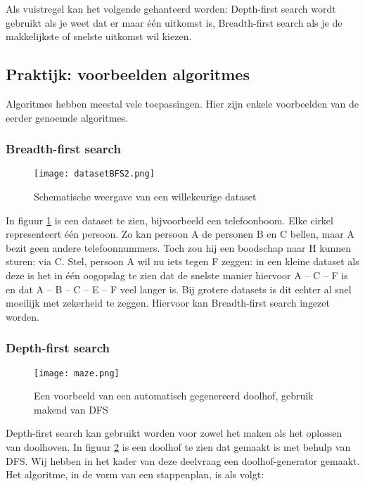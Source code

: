 Als vuistregel kan het volgende gehanteerd worden: Depth-first search wordt gebruikt als je weet dat er maar \'e\'en uitkomst is, Breadth-first search als je de makkelijkste of snelste uitkomst wil kiezen.

\subsection{Praktijk: voorbeelden algoritmes}
Algoritmes hebben meestal vele toepassingen. Hier zijn enkele voorbeelden van de eerder genoemde algoritmes.\\

\subsubsection{Breadth-first search}
\begin{figure}[H]
  \centering
    \texttt{[image: datasetBFS2.png]}
  \caption{Schematische weergave van een willekeurige dataset}
  \label{fig:datasetBFS2}
\end{figure}

In figuur \ref{fig:datasetBFS2} is een dataset te zien, bijvoorbeeld een telefoonboom. Elke cirkel representeert \'e\'en persoon. Zo kan persoon A de personen B en C bellen, maar A bezit geen andere telefoonnummers. Toch zou hij een boodschap naar H kunnen sturen: via C. 
Stel, persoon A wil nu iets tegen F zeggen: in een kleine dataset als deze is het in \'e\'en oogopslag te zien dat de snelste manier hiervoor A – C – F is en dat A – B – C – E – F veel langer is. Bij grotere datasets is dit echter al snel moeilijk met zekerheid te zeggen. Hiervoor kan Breadth-first search ingezet worden.

\subsubsection{Depth-first search}

\begin{figure}[H]
  \centering
    \texttt{[image: maze.png]}
  \caption{Een voorbeeld van een automatisch gegenereerd doolhof, gebruik makend van DFS}
  \label{fig:maze}
\end{figure}

Depth-first search kan gebruikt worden voor zowel het maken als het oplossen van doolhoven. In figuur \ref{fig:maze} is een doolhof te zien dat gemaakt is met behulp van DFS. Wij hebben in het kader van deze deelvraag een doolhof-generator gemaakt. Het algoritme, in de vorm van een stappenplan, is als volgt:

